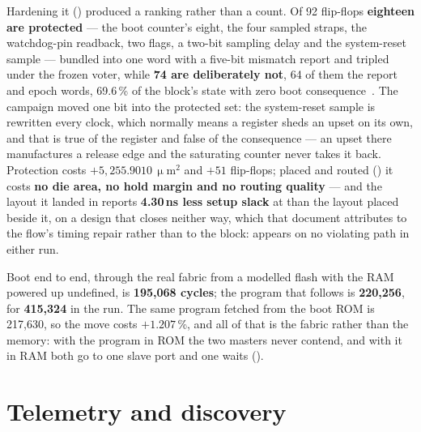 Hardening it () produced a ranking rather than a count. Of 92
flip-flops \textbf{eighteen are protected} --- the boot counter's eight,
the four sampled straps, the watchdog-pin readback, two flags, a two-bit
sampling delay and the
system-reset sample --- bundled into one word with a five-bit mismatch
report and tripled under the
frozen voter, while \textbf{74 are deliberately not}, 64 of them the
report and epoch words, 69.6\,\% of the block's state with zero boot
consequence~\cite{mukherjee2003}. The campaign moved one bit into the protected set: the
system-reset sample is rewritten every clock, which normally means a
register sheds an upset on its own, and that is true of the register and
false of the consequence --- an upset there manufactures a release edge
and the saturating counter never takes it back. Protection costs
$+5{,}255.9010\,\upmu$m$^2$ and $+51$ flip-flops; placed and routed
() it costs \textbf{no die area, no hold margin and no
routing quality} --- and the layout it landed in reports
\textbf{4.30\,ns less setup slack} at  than
the layout placed beside it, on a design that closes neither way, which
that document attributes to the flow's timing repair rather than to the
block:  appears on no violating path in either run.

Boot end to end, through the real fabric from a modelled flash with the
RAM powered up undefined, is \textbf{195{,}068 cycles}; the program that
follows is \textbf{220{,}256}, for \textbf{415{,}324} in the run. The
same program fetched from the boot ROM is 217{,}630, so the move costs
$+1.207$\,\%, and all of that is the fabric rather than the memory: with
the program in ROM the two masters never contend, and with it in RAM both
go to one slave port and one waits ().

\section{Telemetry and discovery}

